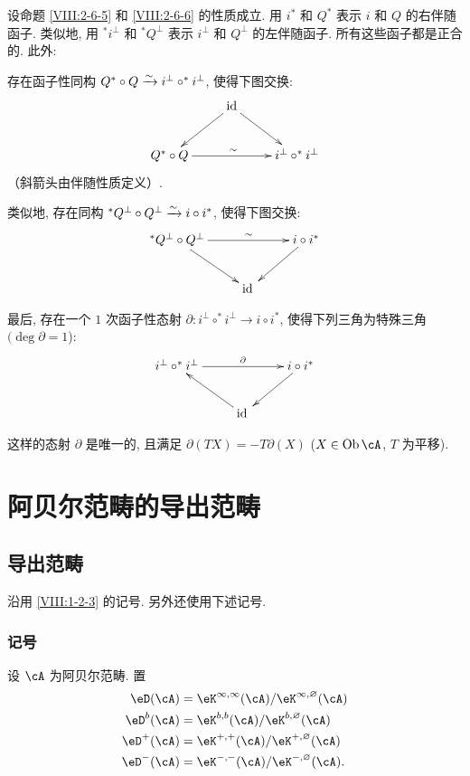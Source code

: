 \begin{proposition}\label{VIII:2-6-7}
设命题 \ref{VIII:2-6-5} 和 \ref{VIII:2-6-6} 的性质成立. 用 $i^\ast$ 和 $Q^\ast$ 表示 $i$ 和 $Q$ 的右伴随函子. 类似地, 用 $^\ast i^\bot$ 和 $^\ast Q^\bot$ 表示 $i^\bot$ 和 $Q^\bot$ 的左伴随函子. 所有这些函子都是正合的. 此外:

存在函子性同构 $Q^\ast\circ Q\xrightarrow\sim i^\bot\circ ^\ast i^\bot$, 使得下图交换:
\[\xymatrix{
  & \operatorname{id} \ar[dl] \ar[dr] \\
  Q^\ast \circ Q \ar[rr]^\sim
    & & i^\bot\circ ^\ast i^\bot
}\]
（斜箭头由伴随性质定义）.

类似地, 存在同构 $^\ast Q^\bot \circ Q^\bot \xrightarrow\sim i\circ i^\ast$, 使得下图交换:
\[\xymatrix{
  ^\ast Q^\bot\circ Q^\bot \ar[rr]^-\sim \ar[dr]
    & & i\circ i^\ast \ar[dl] \\
  & \operatorname{id}{}
}\]

最后, 存在一个 $1$ 次函子性态射 $\partial:i^\bot\circ ^\ast i^\bot \to i\circ i^\ast$, 使得下列三角为特殊三角 $(\deg\partial=1$):
\[\xymatrix{
  i^\bot \circ ^\ast i^\bot \ar[rr]^-\partial
    & & i\circ i^\ast \ar[dl] \\
  & \operatorname{id}{} \ar[ul]
}\]

这样的态射 $\partial$ 是唯一的, 且满足 $\partial(TX)=-T\partial(X)$ ($X\in\operatorname{Ob}\cA$, $T$ 为平移).
\end{proposition}

\def\sgaviiiinternalchapter{II}
\setcounter{section}{0}
\section{阿贝尔范畴的导出范畴}\label{VIII:3}

\subsection{导出范畴}\label{VIII:3-1}

沿用 \ref{VIII:1-2-3} 的记号. 另外还使用下述记号.

\subsubsection{记号}\label{VIII:3-1-1}

设 $\cA$ 为阿贝尔范畴. 置
\begin{align*}
  \eD(\cA) &= \eK^{\infty,\infty}(\cA)/\eK^{\infty,\varnothing}(\cA) \\
  \eD^b(\cA) &= \eK^{b,b}(\cA)/\eK^{b,\varnothing}(\cA) \\
  \eD^+(\cA) &= \eK^{+,+}(\cA) / \eK^{+,\varnothing}(\cA) \\
  \eD^-(\cA) &= \eK^{-,-}(\cA) / \eK^{-,\varnothing}(\cA) \text{.}
\end{align*}

